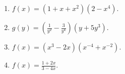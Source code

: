 \begin{multicols}{2}
\begin{enumerate}[ref={\fcProblemRef}]
\item $\displaystyle f(x)=(1+x+x^2)(2-x^4)$.

\item $\displaystyle g(y)= \left(\frac{1}{y^2}- \frac{3}{y^4} \right)(y+5y^3)$.

\item $\displaystyle f(x)=(x^3-2x)(x^{-4}+x^{-2})$.

\item $\displaystyle f(x)=\frac{1+2x}{3-4x}$.

\end{enumerate}
\end{multicols}